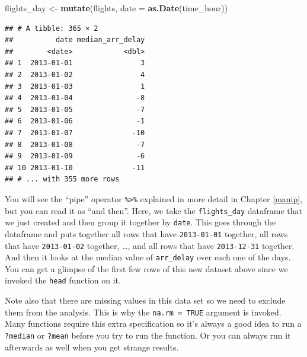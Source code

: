 \documentclass[]{tufte-book}
\newenvironment{Shaded}{\begin{snugshade}}{\end{snugshade}}
\newcommand{\KeywordTok}[1]{\textcolor[rgb]{0.13,0.29,0.53}{\textbf{{#1}}}}
\newcommand{\DataTypeTok}[1]{\textcolor[rgb]{0.13,0.29,0.53}{{#1}}}
\newcommand{\StringTok}[1]{\textcolor[rgb]{0.31,0.60,0.02}{{#1}}}
\newcommand{\OtherTok}[1]{\textcolor[rgb]{0.56,0.35,0.01}{{#1}}}
\newcommand{\NormalTok}[1]{{#1}}
\begin{document}
\begin{Shaded}
\begin{Highlighting}[]
\NormalTok{flights_day <-}\StringTok{ }\KeywordTok{mutate}\NormalTok{(flights, }\DataTypeTok{date =} \KeywordTok{as.Date}\NormalTok{(time_hour))}
\end{Highlighting}
\end{Shaded}

\begin{Shaded}
\end{Shaded}

\begin{verbatim}
## # A tibble: 365 × 2
##          date median_arr_delay
##        <date>            <dbl>
## 1  2013-01-01                3
## 2  2013-01-02                4
## 3  2013-01-03                1
## 4  2013-01-04               -8
## 5  2013-01-05               -7
## 6  2013-01-06               -1
## 7  2013-01-07              -10
## 8  2013-01-08               -7
## 9  2013-01-09               -6
## 10 2013-01-10              -11
## # ... with 355 more rows
\end{verbatim}

You will see the ``pipe'' operator \texttt{\%\textgreater{}\%} explained
in more detail in Chapter \ref{manip}, but you can read it as ``and
then''. Here, we take the \texttt{flights\_day} dataframe that we just
created and then group it together by \texttt{date}. This goes through
the dataframe and puts together all rows that have \texttt{2013-01-01}
together, all rows that have \texttt{2013-01-02} together, \ldots{}, and
all rows that have \texttt{2013-12-31} together. And then it looks at
the median value of \texttt{arr\_delay} over each one of the days. You
can get a glimpse of the first few rows of this new dataset above since
we invoked the \texttt{head} function on it.

Note also that there are missing values in this data set so we need to
exclude them from the analysis. This is why the \texttt{na.rm\ =\ TRUE}
argument is invoked. Many functions require this extra specification so
it's always a good idea to run a \texttt{?median} or \texttt{?mean}
before you try to run the function. Or you can always run it afterwards
as well when you get strange results.
\end{document}
